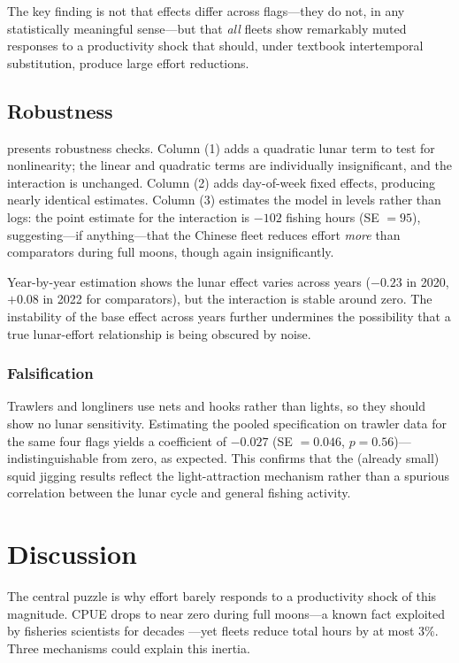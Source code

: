 \documentclass[12pt]{article}
\begin{document}
The key finding is not that effects differ across flags---they do not, in any statistically meaningful sense---but that \textit{all} fleets show remarkably muted responses to a productivity shock that should, under textbook intertemporal substitution, produce large effort reductions.

\subsection{Robustness}



 presents robustness checks. Column (1) adds a quadratic lunar term to test for nonlinearity; the linear and quadratic terms are individually insignificant, and the interaction is unchanged. Column (2) adds day-of-week fixed effects, producing nearly identical estimates. Column (3) estimates the model in levels rather than logs: the point estimate for the interaction is $-102$ fishing hours (SE $= 95$), suggesting---if anything---that the Chinese fleet reduces effort \textit{more} than comparators during full moons, though again insignificantly.

Year-by-year estimation shows the lunar effect varies across years ($-0.23$ in 2020, $+0.08$ in 2022 for comparators), but the interaction is stable around zero. The instability of the base effect across years further undermines the possibility that a true lunar-effort relationship is being obscured by noise.

\subsubsection*{Falsification} Trawlers and longliners use nets and hooks rather than lights, so they should show no lunar sensitivity. Estimating the pooled specification on trawler data for the same four flags yields a coefficient of $-0.027$ (SE $= 0.046$, $p = 0.56$)---indistinguishable from zero, as expected. This confirms that the (already small) squid jigging results reflect the light-attraction mechanism rather than a spurious correlation between the lunar cycle and general fishing activity.


\section{Discussion}
\label{sec:discussion}

The central puzzle is why effort barely responds to a productivity shock of this magnitude. CPUE drops to near zero during full moons---a known fact exploited by fisheries scientists for decades \citep{niu2024}---yet fleets reduce total hours by at most 3\%. Three mechanisms could explain this inertia.
\end{document}
